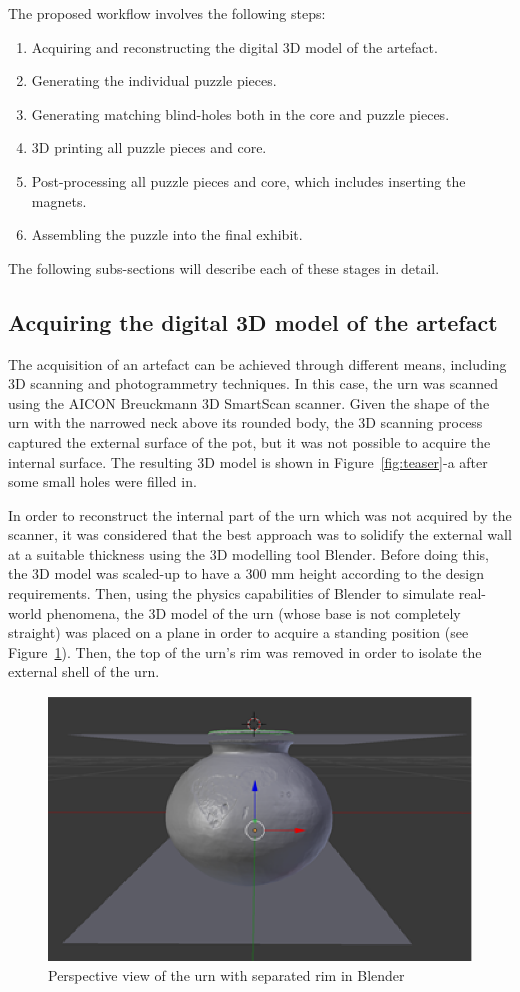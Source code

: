 \documentclass[acmlarge,screen,dvipsnames]{acmart}
\begin{document}
The proposed workflow involves the following steps:
%
\begin{enumerate}
\item Acquiring and reconstructing the digital 3D model of the artefact.
\item Generating the individual puzzle pieces.
\item Generating matching blind-holes both in the core and puzzle pieces.
\item 3D printing all puzzle pieces and core.
\item Post-processing all puzzle pieces and core, which includes
  inserting the magnets.
\item Assembling the puzzle into the final exhibit.
\end{enumerate}
%
The following subs-sections will describe each of these stages in detail.

\subsection{Acquiring the digital 3D model of the artefact}

The acquisition of an artefact can be achieved through different
means, including 3D scanning and photogrammetry techniques. In this
case, the urn was scanned using the AICON Breuckmann 3D SmartScan
scanner. Given the shape of the urn with the narrowed neck above its
rounded body, the 3D scanning process captured the external surface of
the pot, but it was not possible to acquire the internal surface. The
resulting 3D model is shown in Figure~\ref{fig:teaser}-a after some
small holes were filled in.

In order to reconstruct the internal part of the urn which was not
acquired by the scanner, it was considered that the best approach was
to solidify the external wall at a suitable thickness using the 3D
modelling tool Blender. Before doing this, the 3D model was scaled-up
to have a 300 mm height according to the design requirements. Then,
using the physics capabilities of Blender to simulate real-world
phenomena, the 3D model of the urn (whose base is not completely
straight) was placed on a plane in order to acquire a standing
position (see Figure~\ref{fig:blender}). Then, the top of the urn's
rim was removed in order to isolate the external shell of the urn.
%
\begin{figure}[h]
  \centering
  \includegraphics[width=0.6\linewidth]{images/blender2}
  \caption{\label{fig:blender}
    Perspective view of the urn with separated rim in Blender}
\end{figure}
\end{document}
